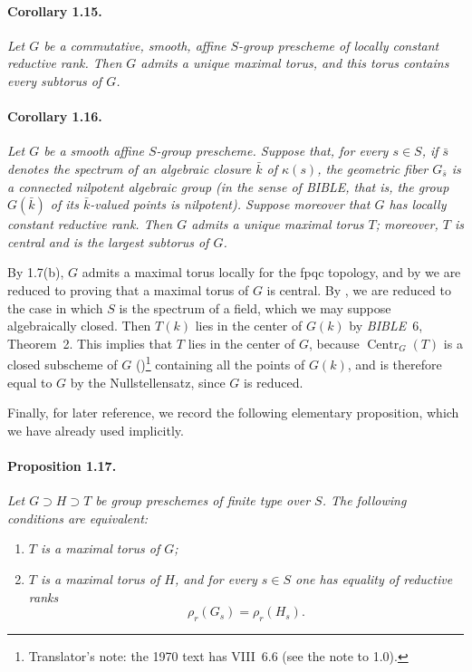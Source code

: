 \paragraph{\textbf{Corollary 1.15.}}
\emph{Let \(G\) be a commutative, smooth, affine \(S\)-group
prescheme of locally constant reductive rank. Then \(G\) admits a
unique maximal torus, and this torus contains every subtorus of
\(G\).}

\paragraph{\textbf{Corollary 1.16.}}
\emph{Let \(G\) be a smooth affine \(S\)-group prescheme. Suppose
that, for every \(s\in S\), if \(\bar s\) denotes the spectrum of an
algebraic closure \(\bar k\) of \(\kappa(s)\), the geometric fiber
\(G_{\bar s}\) is a connected nilpotent algebraic group (in the sense
of \emph{BIBLE}, that is, the group \(G(\bar k)\) of its
\(\bar k\)-valued points is nilpotent). Suppose moreover that \(G\)
has locally constant reductive rank. Then \(G\) admits a unique
maximal torus \(T\); moreover, \(T\) is central and is the largest
subtorus of \(G\).}

By 1.7(b), \(G\) admits a maximal torus locally for the fpqc topology,
and by  we are reduced to proving that a maximal torus of \(G\) is
central. By , we are reduced to the case in which \(S\) is
the spectrum of a field, which we may suppose algebraically closed.
Then \(T(k)\) lies in the center of \(G(k)\) by \emph{BIBLE}~6,
Theorem~2. This implies that \(T\) lies in the center of \(G\), because
\(\operatorname{Centr}_G(T)\) is a closed subscheme of \(G\)
()\footnote{Translator's note: the 1970 text has VIII~6.6
(see the note to 1.0).} containing all the points of \(G(k)\), and is therefore
equal to \(G\) by the Nullstellensatz, since \(G\) is reduced.

Finally, for later reference, we record the following elementary
proposition, which we have already used implicitly.

\paragraph{\textbf{Proposition 1.17.}}
\emph{Let \(G\supset H\supset T\) be group preschemes of finite type
over \(S\). The following conditions are equivalent:}
\begin{enumerate}
\renewcommand{\labelenumi}{(\roman{enumi})}
\item \emph{\(T\) is a maximal torus of \(G\);}
\item \emph{\(T\) is a maximal torus of \(H\), and for every
  \(s\in S\) one has equality of reductive ranks
  \[
    \rho_r(G_s)=\rho_r(H_s).
  \]}
\end{enumerate}

